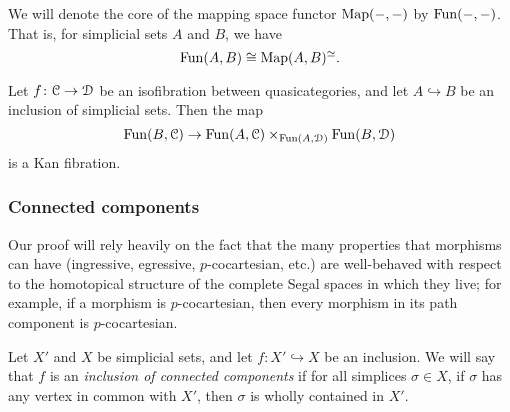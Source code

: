 \documentclass[main.tex]{subfiles}
\begin{document}
We will denote the core of the mapping space functor $\mathrm{Map}(-, -)$ by $\mathrm{Fun}(-, -)$. That is, for simplicial sets $A$ and $B$, we have
\begin{equation*}
  \mathrm{Fun}(A, B) \cong \mathrm{Map}(A, B)^{\simeq}.
\end{equation*}

\begin{corollary}
  \label{cor:kan_fib_and_isofib}
  Let $f\colon \mathcal{C} \to \mathcal{D}$ be an isofibration between quasicategories, and let $A \hookrightarrow B$ be an inclusion of simplicial sets. Then the map
  \begin{equation*}
    \mathrm{Fun}(B, \mathcal{C}) \to \mathrm{Fun}(A, \mathcal{C}) \times_{\mathrm{Fun}(A, \mathcal{D})} \mathrm{Fun}(B, \mathcal{D})
  \end{equation*}
  is a Kan fibration.
\end{corollary}

\subsubsection*{Connected components}

Our proof will rely heavily on the fact that the many properties that morphisms can have (ingressive, egressive, $p$-cocartesian, etc.) are well-behaved with respect to the homotopical structure of the complete Segal spaces in which they live; for example, if a morphism is $p$-cocartesian, then every morphism in its path component is $p$-cocartesian.

Let $X'$ and $X$ be simplicial sets, and let $f\colon X' \hookrightarrow X$ be an inclusion. We will say that $f$ is an \emph{inclusion of connected components} if for all simplices $\sigma \in X$, if $\sigma$ has any vertex in common with $X'$, then $\sigma$ is wholly contained in $X'$.
\end{document}
